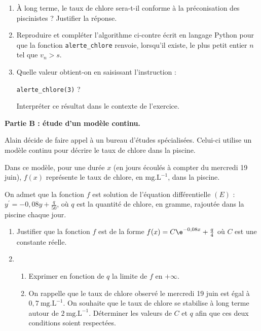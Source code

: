 \begin{enumerate}[resume]
	\item À long terme, le taux de chlore sera-t-il conforme à la préconisation des piscinistes ? Justifier la réponse.
	\item Reproduire et compléter l'algorithme ci-contre écrit en langage \textsf{Python} pour que la fonction \texttt{alerte\_chlore} renvoie, lorsqu'il existe, le plus petit entier $n$ tel que $v_{n}>s$.
	\item Quelle valeur obtient-on en saisissant l'instruction :
	
	\hfill\texttt{alerte\_chlore(3)} ?\hfill~
	
	Interpréter ce résultat dans le contexte de l'exercice.
\end{enumerate}

\medskip

\textbf{Partie B : étude d'un modèle continu.}

\medskip

Alain décide de faire appel à un bureau d'études spécialisées. Celui-ci utilise un modèle continu pour décrire le taux de chlore dans la piscine.

\smallskip

Dans ce modèle, pour une durée $x$ (en jours écoulés à compter du mercredi 19 juin), $f(x)$ représente le taux de chlore, en $\text{mg.L}^{-1}$, dans la piscine.

\smallskip

On admet que la fonction $f$ est solution de l'équation différentielle $(E)$ : $y^{\prime}=-0,08 y+\frac{q}{50}$, où $q$ est la quantité de chlore, en gramme, rajoutée dans la piscine chaque jour.

\begin{enumerate}
	\item Justifier que la fonction $f$ est de la forme $f(x)=C \e^{-0,08 x}+\frac{q}{4}$ où $C$ est une constante réelle.
	\item 
	
	\begin{enumerate}
		\item Exprimer en fonction de $q$ la limite de $f$ en $+\infty$.
		\item On rappelle que le taux de chlore observé le mercredi 19 juin est égal à $0,7~\text{mg.L}^{-1}$. On souhaite que le taux de chlore se stabilise à long terme autour de $2~\text{mg.L}^{-1}$. Déterminer les valeurs de $C$ et $q$ afin que ces deux conditions soient respectées.
	\end{enumerate}
\end{enumerate}